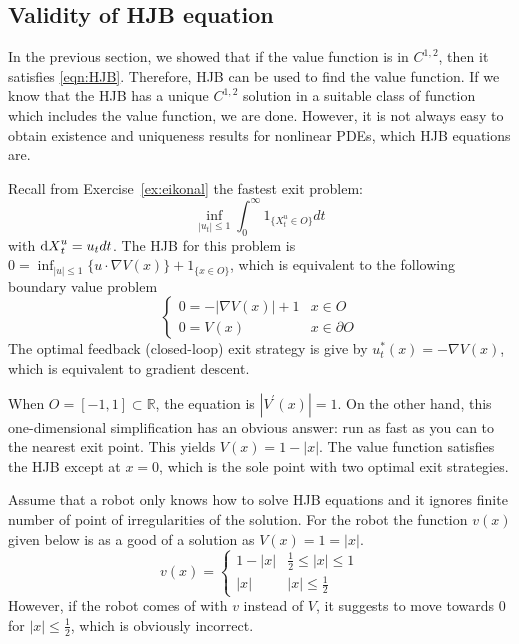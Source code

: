 \documentclass[11pt]{book}
\newcommand{\dX}{\text{\normalfont d}X}
\begin{document}
\subsection{Validity of HJB equation}
In the previous section, we showed that if the value function is in $C^{1,2}$, then it satisfies \eqref{eqn:HJB}. Therefore, HJB can be used to find the value function. If we know that the HJB has a unique $C^{1,2}$ solution in a suitable class of function which includes the value function, we are done. However, it is not always easy to obtain existence and uniqueness results for nonlinear PDEs, which HJB equations are. 
\begin{eg}
Recall from Exercise~\ref{ex:eikonal} the fastest exit problem:
\begin{equation}
    \inf_{|u_t|\le 1}\int_0^\infty 1_{\{X^u_t\in O\}} dt
\end{equation}
with ${\dX}_t^u=u_t dt$.
   The HJB for this problem is $0=\inf_{|u|\le 1}\{u\cdot \nabla V(x)\}+1_{\{x\in O\}}$, which is equivalent to the following boundary value problem
   \begin{equation}
   \begin{cases}
       0=-|\nabla V(x)|+1& x\in O\\
       0=V(x)& x\in\partial O
   \end{cases}
   \end{equation}
The optimal feedback (closed-loop) exit strategy is give by $u^*_t(x)=-\nabla V(x)$, which is equivalent to gradient descent.
   
When $O=[-1,1]\subset\mathbb{R}$, the equation is $|V^\prime(x)|=1$. On the other hand, this one-dimensional simplification has an obvious answer: run as fast as you can to the nearest exit point. This yields $V(x)=1-|x|$. The value function satisfies the HJB except at $x=0$, which is the sole point with two optimal exit strategies.

Assume that a robot only knows how to solve HJB equations and it ignores finite number of point of irregularities of the solution. For the robot the function $v(x)$ given below is as a good of a solution as $V(x)=1=|x|$. 
\begin{equation}
    v(x)=
    \begin{cases}
        1-|x| & \frac12\le |x| \le 1\\
        |x| & |x|\le \frac12
    \end{cases}
\end{equation}
However, if the robot comes of with $v$ instead of $V$, it suggests to move towards $0$ for $|x|\le \frac12$, which is obviously incorrect. 
\end{eg}
\end{document}
